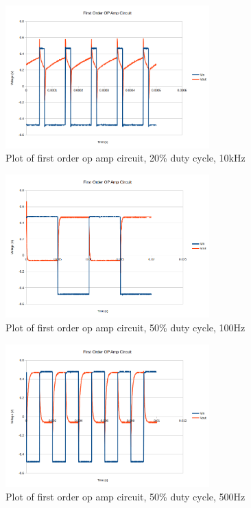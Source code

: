 \documentclass[10pt]{article}
\begin{document}
\begin{figure}[H]
	\centering
	\includegraphics[width=0.7\textwidth]{OPAmp20_10k}
	\caption{Plot of first order op amp circuit, 20\% duty cycle, 10kHz}
\end{figure}
\begin{figure}[H]
	\centering
	\includegraphics[width=0.7\textwidth]{OPAmp50_100}
	\caption{Plot of first order op amp circuit, 50\% duty cycle, 100Hz}
\end{figure}
\begin{figure}[H]
	\centering
	\includegraphics[width=0.7\textwidth]{OPAmp50_500}
	\caption{Plot of first order op amp circuit, 50\% duty cycle, 500Hz}
\end{figure}
\end{document}
